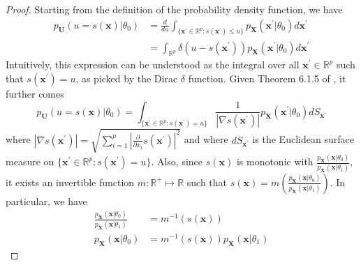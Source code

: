 \documentclass[12pt]{article}
\numberwithin{equation}{section}
\theoremstyle{plain}
\begin{document}
\begin{proof}
Starting from the definition of the probability density function, we have
\begin{align}
p_{\mathbf{U}}(u=s(\mathbf{x})|\theta_0) &= \frac{d}{du}  \int_{\{\mathbf{x}^\prime \in \mathbb{R}^p : s(\mathbf{x}^\prime) \leq u\}} p_\mathbf{X}(\mathbf{x}^\prime|\theta_0) d\mathbf{x}^\prime \nonumber \\
&= \int_{\mathbb{R}^p} \delta(u - s(\mathbf{x}^\prime)) p_\mathbf{X}(\mathbf{x}^\prime|\theta_0) d\mathbf{x}^\prime
\end{align}
Intuitively, this expression can be understood as the integral
over all $\mathbf{x}^\prime \in \mathbb{R}^p$ such that $s(\mathbf{x}^\prime) = u$, as picked
by the Dirac $\delta$ function. Given Theorem 6.1.5 of \citet{Hrmander1990},
it further comes
\begin{equation}
p_{\mathbf{U}}(u=s(\mathbf{x})|\theta_0) = \int_{\{\mathbf{x}^\prime \in \mathbb{R}^p : s(\mathbf{x}^\prime) = u\}} \frac{1}{|\nabla s(\mathbf{x}^\prime)|} p_\mathbf{X}(\mathbf{x}^\prime|\theta_0) dS_{\mathbf{x}^\prime} \label{eqn:hormander}
\end{equation}
where $|\nabla s(\mathbf{x}^\prime)| = \sqrt{\sum_{i=1}^p |\frac{\partial}{\partial x_i} s(\mathbf{x}^\prime)|^2}$
and where $dS_{\mathbf{x}^\prime}$ is the Euclidean surface measure on $\{\mathbf{x}^\prime \in \mathbb{R}^p : s(\mathbf{x}^\prime) = u\}$.
Also, since $s(\mathbf{x})$ is monotonic with
$\frac{p_\mathbf{X}(\mathbf{x}|\theta_0)}{p_\mathbf{X}(\mathbf{x}|\theta_1)}$,
it exists an invertible function $m:\mathbb{R}^+ \mapsto \mathbb{R}$ such
that $s(\mathbf{x}) = m(\frac{p_\mathbf{X}(\mathbf{x}|\theta_0)}{p_\mathbf{X}(\mathbf{x}|\theta_1)})$.
In particular, we have
\begin{align}
\frac{p_\mathbf{X}(\mathbf{x}|\theta_0)}{p_\mathbf{X}(\mathbf{x}|\theta_1)} &= m^{-1}(s(\mathbf{x})) \nonumber \\
p_\mathbf{X}(\mathbf{x}|\theta_0) &= m^{-1}(s(\mathbf{x})) p_\mathbf{X}(\mathbf{x}|\theta_1) \label{eqn:mapping}
\end{align}

\end{proof}
\end{document}
